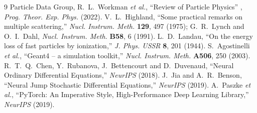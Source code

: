 \documentclass[11pt]{article}
\begin{document}
\begin{thebibliography}{9}
 Particle Data Group, R.~L.~Workman \emph{et al.},
  ``Review of Particle Physics'' ,
  \emph{Prog. Theor. Exp. Phys.} (2022).
 V.~L.~Highland, ``Some practical remarks on multiple
  scattering,'' \emph{Nucl. Instrum. Meth.} \textbf{129}, 497 (1975);
  G.~R.~Lynch and O.~I.~Dahl, \emph{Nucl. Instrum. Meth.} \textbf{B58}, 6 (1991).
 L.~D.~Landau, ``On the energy loss of fast particles by
  ionization,'' \emph{J. Phys. USSR} \textbf{8}, 201 (1944).
 S.~Agostinelli \emph{et al.},
  ``Geant4 -- a simulation toolkit,'' \emph{Nucl. Instrum. Meth.} \textbf{A506},
  250 (2003).
 R.~T.~Q.~Chen, Y.~Rubanova, J.~Bettencourt and D.~Duvenaud,
  ``Neural Ordinary Differential Equations,'' \emph{NeurIPS} (2018).
 J.~Jia and A.~R.~Benson, ``Neural Jump Stochastic Differential
  Equations,'' \emph{NeurIPS} (2019).
 A.~Paszke \emph{et al.}, ``PyTorch: An Imperative Style,
  High-Performance Deep Learning Library,'' \emph{NeurIPS} (2019).
\end{thebibliography}
\end{document}
